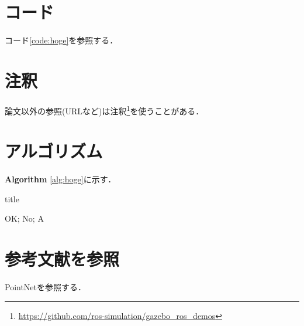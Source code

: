 \documentclass[a4paper,10pt]{jsarticle}
\begin{document}
\section{コード}
コード\ref{code:hoge}を参照する．


\section{注釈}
論文以外の参照(URLなど)は注釈\footnote{\url{https://github.com/ros-simulation/gazebo_ros_demos}}を使うことがある．



\section{アルゴリズム}
{\bf{Algorithm}} \ref{alg:hoge}に示す．

\begin{algorithm*}[H]
    \small{
        \caption{title}
        \label{alg:hoge}
        {
            {
                OK;
            }
            \Else
            {
                No;
            }
        }
        \Return A
    }
\end{algorithm*}

\section{参考文献を参照}
PointNet\cite{point_net}を参照する．

\end{document}
